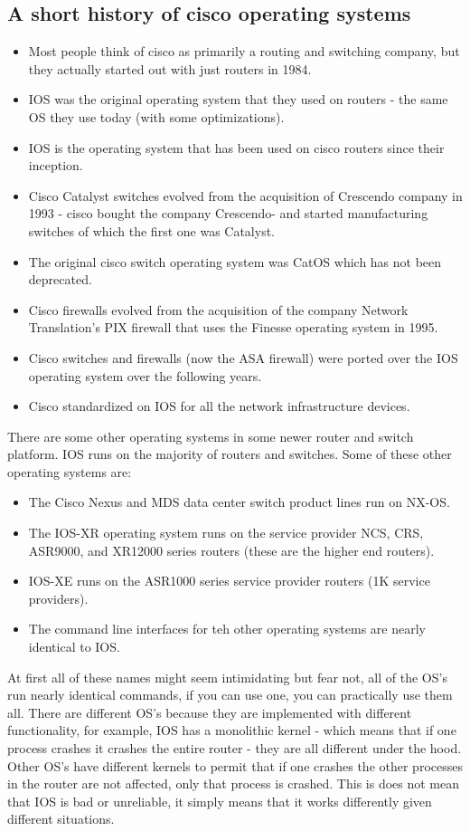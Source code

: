 \subsection{A short history of cisco operating systems}
\begin{itemize}
    \item Most people think of cisco as primarily a routing and switching company, but they actually started out with just routers in 1984. 
    \item IOS was the original operating system that they used on routers - the same OS they use today (with some optimizations).
    \item IOS is the operating system that has been used on cisco routers since their inception.
    \item Cisco Catalyst switches evolved from the acquisition of Crescendo company in 1993 - cisco bought the company Crescendo- and started manufacturing switches of which the first one was Catalyst. 
    \item The original cisco switch operating system was CatOS which has not been deprecated.
    \item Cisco firewalls evolved from the acquisition of the company Network Translation's PIX firewall that uses the Finesse operating system in 1995.
    \item Cisco switches and firewalls (now the ASA firewall) were ported over the IOS operating system over the following years.
    \item Cisco standardized on IOS for all the network infrastructure devices.
\end{itemize}
There are some other operating systems in some newer router and switch platform. IOS runs on the majority of routers and switches. Some of these other operating systems are:
\begin{itemize}
    \item The Cisco Nexus and MDS data center switch product lines run on NX-OS.
    \item The IOS-XR operating system runs on the service provider NCS, CRS, ASR9000, and XR12000 series routers (these are the higher end routers).
    \item IOS-XE runs on the ASR1000 series service provider routers (1K service providers).
    \item The command line interfaces for teh other operating systems are nearly identical to IOS.
\end{itemize}
At first all of these names might seem intimidating but fear not, all of the OS's run nearly identical commands, if you can use one, you can practically use them all. There are different OS's because they are implemented with different functionality, for example, IOS has a monolithic kernel - which means that if one process crashes it crashes the entire router - they are all different under the hood. Other OS's have different kernels to permit that if one crashes the other processes in the router are not affected, only that process is crashed. This is does not mean that IOS is bad or unreliable, it simply means that it works differently given different situations.


